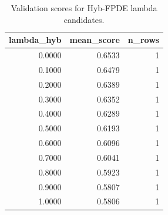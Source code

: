 \begin{table}[t]
\caption{Validation scores for Hyb-FPDE lambda candidates.}
\label{tab:lambda_distribution_computed}
\centering
\begin{tabular}{rrr}
\toprule
lambda\_hyb & mean\_score & n\_rows \\
\midrule
0.0000 & 0.6533 & 1 \\
0.1000 & 0.6479 & 1 \\
0.2000 & 0.6389 & 1 \\
0.3000 & 0.6352 & 1 \\
0.4000 & 0.6289 & 1 \\
0.5000 & 0.6193 & 1 \\
0.6000 & 0.6096 & 1 \\
0.7000 & 0.6041 & 1 \\
0.8000 & 0.5923 & 1 \\
0.9000 & 0.5807 & 1 \\
1.0000 & 0.5806 & 1 \\
\bottomrule
\end{tabular}

\end{table}

